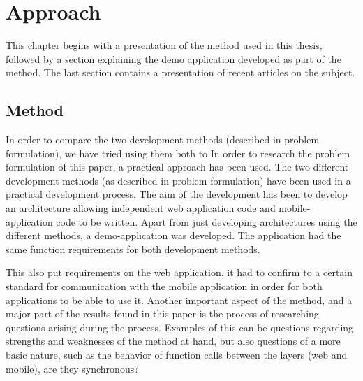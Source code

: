 
\chapter{Approach}
This chapter begins with a presentation of the method used in this thesis, followed by a section explaining the demo application developed as part of the method. The last section contains a presentation of recent articles on the subject. 
\section{Method}
In order to compare the two development methods (described in problem formulation), we have tried using them both to 
In order to research the problem formulation of this paper, a practical approach has been used. The two different development methods (as described in problem formulation) have been used in a practical development process. The aim of the development has been to develop an architecture allowing independent web application code and mobile-application code to be written.
\newline\newline
Apart from just developing architectures using the different methods, a demo-application was developed. The application had the same function requirements for both development methods. 

This also put requirements on the web application, it had to confirm to a certain standard for communication with the mobile application in order for both applications to be able to use it. 
\newline\newline
Another important aspect of the method, and a major part of the results found in this paper is the process of researching questions arising during the process. Examples of this can be questions regarding strengths and weaknesses of the method at hand, but also questions of a more basic nature, such as the behavior of function calls between the layers (web and mobile), are they synchronous?

